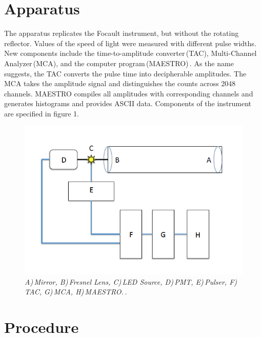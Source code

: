 \documentclass[aps,prl,twocolumn,superscriptaddress]{revtex4-1}
\begin{document}


\section{Apparatus}



The apparatus replicates the Focault instrument, but without the rotating reflector. Values of the speed of light were measured with different pulse widths. New components include the time-to-amplitude converter\,(TAC), Multi-Channel Analyzer\,(MCA), and the computer program\,(MAESTRO)\,\cite{2}. As the name suggests, the TAC converts the pulse time into decipherable amplitudes. The MCA takes the amplitude signal and distinguishes the counts across 2048 channels. MAESTRO compiles all amplitudes with corresponding channels and generates histograms and provides ASCII data. Components of the instrument are specified in figure 1.

\begin{figure}[h!]
  \begin{center}
\centerline{\includegraphics[width=3.in]{solapp.png}}
\caption{\it \small{A)\,Mirror, B)\,Fresnel Lens, C)\,LED Source, D)\,PMT, E)\,Pulser, F)\,TAC, G)\,MCA, H)\,MAESTRO.\,\cite{3}. \label{fig1}}}
  \end{center}
\end{figure}

\section{Procedure}
\end{document}
